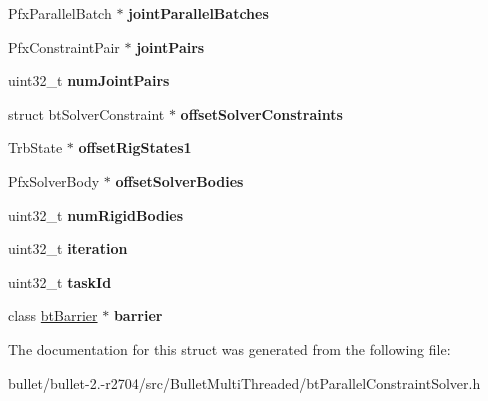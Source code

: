 \begin{DoxyCompactItemize}
\item 
\hypertarget{struct_pfx_solve_constraints_i_o_acf41cd92a8accffefdf6e0474565029e}{Pfx\+Parallel\+Batch $\ast$ {\bfseries joint\+Parallel\+Batches}}\label{struct_pfx_solve_constraints_i_o_acf41cd92a8accffefdf6e0474565029e}

\item 
\hypertarget{struct_pfx_solve_constraints_i_o_ab395d3833c0c899e91000abe38384f52}{Pfx\+Constraint\+Pair $\ast$ {\bfseries joint\+Pairs}}\label{struct_pfx_solve_constraints_i_o_ab395d3833c0c899e91000abe38384f52}

\item 
\hypertarget{struct_pfx_solve_constraints_i_o_aaa624ef1b0462bcb766f47a454580407}{uint32\+\_\+t {\bfseries num\+Joint\+Pairs}}\label{struct_pfx_solve_constraints_i_o_aaa624ef1b0462bcb766f47a454580407}

\item 
\hypertarget{struct_pfx_solve_constraints_i_o_a1b2cb8a512cc25109626bd98fc270ae5}{struct bt\+Solver\+Constraint $\ast$ {\bfseries offset\+Solver\+Constraints}}\label{struct_pfx_solve_constraints_i_o_a1b2cb8a512cc25109626bd98fc270ae5}

\item 
\hypertarget{struct_pfx_solve_constraints_i_o_ae903622d515db412a2159eb2945a1cf8}{Trb\+State $\ast$ {\bfseries offset\+Rig\+States1}}\label{struct_pfx_solve_constraints_i_o_ae903622d515db412a2159eb2945a1cf8}

\item 
\hypertarget{struct_pfx_solve_constraints_i_o_aec1d729fb58ca56d072b4bc04993380c}{Pfx\+Solver\+Body $\ast$ {\bfseries offset\+Solver\+Bodies}}\label{struct_pfx_solve_constraints_i_o_aec1d729fb58ca56d072b4bc04993380c}

\item 
\hypertarget{struct_pfx_solve_constraints_i_o_afff263aaa89e8f6abe3fb34019954541}{uint32\+\_\+t {\bfseries num\+Rigid\+Bodies}}\label{struct_pfx_solve_constraints_i_o_afff263aaa89e8f6abe3fb34019954541}

\item 
\hypertarget{struct_pfx_solve_constraints_i_o_aa21b9ac19393abe12574d8490322f06f}{uint32\+\_\+t {\bfseries iteration}}\label{struct_pfx_solve_constraints_i_o_aa21b9ac19393abe12574d8490322f06f}

\item 
\hypertarget{struct_pfx_solve_constraints_i_o_ade0f4570184210bb96d83ba2254b91d6}{uint32\+\_\+t {\bfseries task\+Id}}\label{struct_pfx_solve_constraints_i_o_ade0f4570184210bb96d83ba2254b91d6}

\item 
\hypertarget{struct_pfx_solve_constraints_i_o_a586d6c1d1a8b81e921ed59db9c5738ce}{class \hyperlink{classbt_barrier}{bt\+Barrier} $\ast$ {\bfseries barrier}}\label{struct_pfx_solve_constraints_i_o_a586d6c1d1a8b81e921ed59db9c5738ce}

\end{DoxyCompactItemize}


The documentation for this struct was generated from the following file\+:\begin{DoxyCompactItemize}
\item 
bullet/bullet-\/2.-\/r2704/src/\+Bullet\+Multi\+Threaded/bt\+Parallel\+Constraint\+Solver.\+h\end{DoxyCompactItemize}
